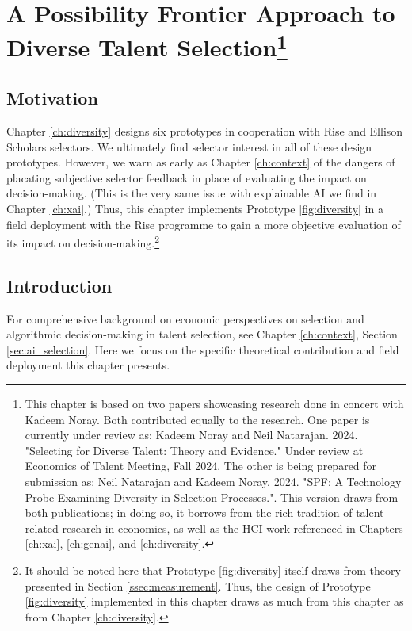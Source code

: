 \chapter[A Possibility Frontier Approach to Diverse Talent Selection]{\label{ch:spf}A Possibility Frontier Approach to Diverse Talent Selection\footnote{This chapter is based on two papers showcasing research done in concert with Kadeem Noray. Both contributed equally to the research. One paper is currently under review as: Kadeem Noray and Neil Natarajan. 2024. "Selecting for Diverse Talent: Theory and Evidence." Under review at Economics of Talent Meeting, Fall 2024. The other is being prepared for submission as: Neil Natarajan and Kadeem Noray. 2024. "SPF: A Technology Probe Examining Diversity in Selection Processes.". This version draws from both publications; in doing so, it borrows from the rich tradition of talent-related research in economics, as well as the HCI work referenced in Chapters \ref{ch:xai}, \ref{ch:genai}, and \ref{ch:diversity}.}}


\minitoc

\section{Motivation}
Chapter \ref{ch:diversity} designs six prototypes in cooperation with Rise and Ellison Scholars selectors. We ultimately find selector interest in all of these design prototypes. However, we warn as early as Chapter \ref{ch:context} of the dangers of placating subjective selector feedback in place of evaluating the impact on decision-making. (This is the very same issue with explainable AI we find in Chapter \ref{ch:xai}.) Thus, this chapter implements Prototype \ref{fig:diversity} in a field deployment with the Rise programme to gain a more objective evaluation of its impact on decision-making.\footnote{It should be noted here that Prototype \ref{fig:diversity} itself draws from theory presented in Section \ref{ssec:measurement}. Thus, the design of Prototype \ref{fig:diversity} implemented in this chapter draws as much from this chapter as from Chapter \ref{ch:diversity}.}

\section{Introduction}\label{sec:spfintro}
For comprehensive background on economic perspectives on selection and algorithmic decision-making in talent selection, see Chapter \ref{ch:context}, Section \ref{sec:ai_selection}. Here we focus on the specific theoretical contribution and field deployment this chapter presents.

